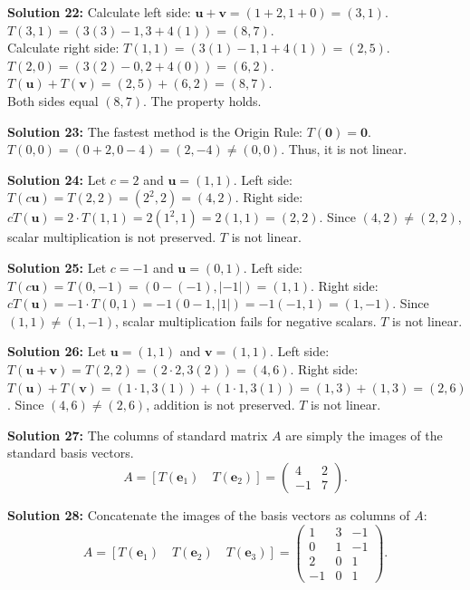 \documentclass{article}
\begin{document}
\textbf{Solution 22:}
Calculate left side: $\mathbf{u} + \mathbf{v} = (1+2, 1+0) = (3, 1)$. \\
$T(3, 1) = (3(3)-1, 3+4(1)) = (8, 7)$. \\
Calculate right side: $T(1, 1) = (3(1)-1, 1+4(1)) = (2, 5)$. \\
$T(2, 0) = (3(2)-0, 2+4(0)) = (6, 2)$. \\
$T(\mathbf{u}) + T(\mathbf{v}) = (2, 5) + (6, 2) = (8, 7)$. \\
Both sides equal $(8, 7)$. The property holds.

\textbf{Solution 23:}
The fastest method is the Origin Rule: $T(\mathbf{0}) = \mathbf{0}$. 
$T(0, 0) = (0 + 2, 0 - 4) = (2, -4) \neq (0, 0)$. Thus, it is not linear.

\textbf{Solution 24:}
Let $c = 2$ and $\mathbf{u} = (1, 1)$. 
Left side: $T(c\mathbf{u}) = T(2, 2) = (2^2, 2) = (4, 2)$.
Right side: $cT(\mathbf{u}) = 2 \cdot T(1, 1) = 2(1^2, 1) = 2(1, 1) = (2, 2)$.
Since $(4, 2) \neq (2, 2)$, scalar multiplication is not preserved. $T$ is not linear.

\textbf{Solution 25:}
Let $c = -1$ and $\mathbf{u} = (0, 1)$.
Left side: $T(c\mathbf{u}) = T(0, -1) = (0 - (-1), |-1|) = (1, 1)$.
Right side: $cT(\mathbf{u}) = -1 \cdot T(0, 1) = -1(0 - 1, |1|) = -1(-1, 1) = (1, -1)$.
Since $(1, 1) \neq (1, -1)$, scalar multiplication fails for negative scalars. $T$ is not linear.

\textbf{Solution 26:}
Let $\mathbf{u} = (1, 1)$ and $\mathbf{v} = (1, 1)$.
Left side: $T(\mathbf{u} + \mathbf{v}) = T(2, 2) = (2 \cdot 2, 3(2)) = (4, 6)$.
Right side: $T(\mathbf{u}) + T(\mathbf{v}) = (1 \cdot 1, 3(1)) + (1 \cdot 1, 3(1)) = (1, 3) + (1, 3) = (2, 6)$.
Since $(4, 6) \neq (2, 6)$, addition is not preserved. $T$ is not linear.

\textbf{Solution 27:}
The columns of standard matrix $A$ are simply the images of the standard basis vectors. 
$$A = [T(\mathbf{e}_1) \quad T(\mathbf{e}_2)] = \begin{pmatrix} 4 & 2 \\ -1 & 7 \end{pmatrix}.$$

\textbf{Solution 28:}
Concatenate the images of the basis vectors as columns of $A$:
$$A = [T(\mathbf{e}_1) \quad T(\mathbf{e}_2) \quad T(\mathbf{e}_3)] = \begin{pmatrix} 1 & 3 & -1 \\ 0 & 1 & -1 \\ 2 & 0 & 1 \\ -1 & 0 & 1 \end{pmatrix}.$$
\end{document}

